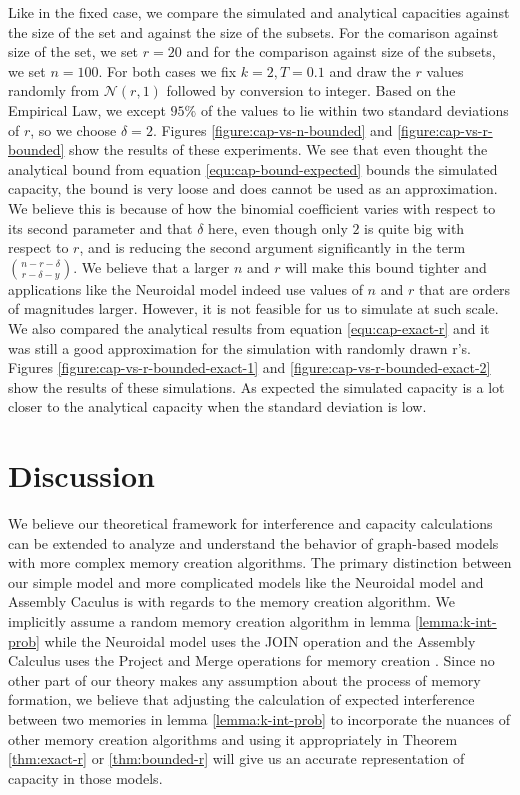Like in the fixed case, we compare the simulated and analytical capacities against the size of the set and against the size of the subsets. For the comarison against size of the set, we set $r = 20$ and for the comparison against size of the subsets, we set $n = 100$. For both cases we fix $k=2, T=0.1$ and draw the $r$ values randomly from $\mathcal{N}(r,1)$ followed by conversion to integer. Based on the Empirical Law, we except $95\%$ of the values to lie within two standard deviations of $r$, so we choose $\delta = 2$. Figures \ref{figure:cap-vs-n-bounded} and \ref{figure:cap-vs-r-bounded} show the results of these experiments. We see that even thought the analytical bound from equation \ref{equ:cap-bound-expected} bounds the simulated capacity, the bound is very loose and does cannot be used as an approximation. We believe this is because of how the binomial coefficient varies with respect to its second parameter and that $\delta$ here, even though only $2$ is quite big with respect to $r$, and is reducing the second argument significantly in the term $n - r - \delta \choose r - \delta - y$. We believe that a larger $n$ and $r$ will make this bound tighter and applications like the Neuroidal model indeed use values of $n$ and $r$ that are orders of magnitudes larger. However, it is not feasible for us to simulate at such scale. We also compared the analytical results from equation \ref{equ:cap-exact-r} and it was still a good approximation for the simulation with randomly drawn r's. Figures \ref{figure:cap-vs-r-bounded-exact-1} and \ref{figure:cap-vs-r-bounded-exact-2} show the results of these simulations. As expected the simulated capacity is a lot closer to the analytical capacity when the standard deviation is low. 

\section{Discussion}

We believe our theoretical framework for interference and capacity calculations can be extended to analyze and understand the behavior of graph-based models with more complex memory creation algorithms. The primary distinction between our simple model and more complicated models like the Neuroidal model and Assembly Caculus is with regards to the memory creation algorithm. We implicitly assume a random memory creation algorithm in lemma \ref{lemma:k-int-prob} while the Neuroidal model uses the JOIN operation and the Assembly Calculus uses the Project and Merge operations for memory creation \cite{papadimitriou2020brain, valiant2005memorization}. Since no other part of our theory makes any assumption about the process of memory formation, we believe that adjusting the calculation of expected interference between two memories in lemma \ref{lemma:k-int-prob} to incorporate the nuances of other memory creation algorithms and using it appropriately in Theorem \ref{thm:exact-r} or \ref{thm:bounded-r} will give us an accurate representation of capacity in those models.

